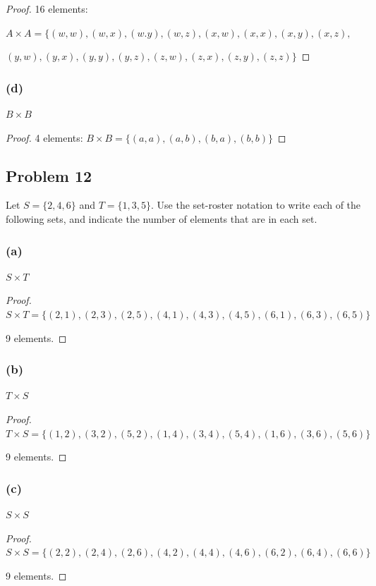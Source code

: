 \documentclass[14pt]{extarticle}
\begin{document}
\begin{proof}
16 elements:

$A \times A = \{(w, w), (w, x), (w. y), (w, z), (x, w), (x, x), (x, y), (x, z),$

$(y, w), (y, x), (y, y), (y, z), (z, w), (z, x), (z, y), (z, z)\}$
\end{proof}

\subsubsection{(d)}
$B \times B$

\begin{proof}
4 elements: $B \times B = \{(a, a), (a, b), (b, a), (b, b)\}$
\end{proof}

\subsection{Problem 12}
Let $S = \{2, 4, 6\}$ and $T = \{1, 3, 5\}$. Use the set-roster notation to
write each of the following sets, and indicate the number of elements that are
in each set.

\subsubsection{(a)}
$S \times T$

\begin{proof}
$S \times T = \{(2, 1), (2, 3), (2, 5), (4, 1), (4, 3), (4, 5), (6, 1), (6, 3),
(6, 5)\}$

9 elements.
\end{proof}

\subsubsection{(b)}
$T \times S$

\begin{proof}
$T \times S = \{(1, 2), (3, 2), (5, 2), (1, 4), (3, 4), (5, 4), (1, 6), (3, 6),
(5, 6)\}$

9 elements.
\end{proof}

\subsubsection{(c)}
$S \times S$

\begin{proof}
$S \times S = \{(2, 2), (2, 4), (2, 6), (4, 2), (4, 4), (4, 6), (6, 2), (6, 4),
(6, 6)\}$

9 elements.
\end{proof}
\end{document}
